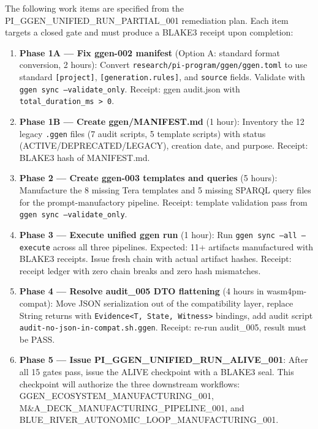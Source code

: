 The following work items are specified from the PI\_GGEN\_UNIFIED\_RUN\_PARTIAL\_001 remediation plan. Each item targets a closed gate and must produce a BLAKE3 receipt upon completion:

\begin{enumerate}
  \item \textbf{Phase 1A --- Fix ggen-002 manifest} (Option A: standard format conversion, 2 hours): Convert \texttt{research/pi-program/ggen/ggen.toml} to use standard \texttt{[project]}, \texttt{[generation.rules]}, and \texttt{source} fields. Validate with \texttt{ggen sync --validate\_only}. Receipt: ggen audit.json with \texttt{total\_duration\_ms > 0}.
  \item \textbf{Phase 1B --- Create ggen/MANIFEST.md} (1 hour): Inventory the 12 legacy \texttt{.ggen} files (7 audit scripts, 5 template scripts) with status (ACTIVE/DEPRECATED/LEGACY), creation date, and purpose. Receipt: BLAKE3 hash of MANIFEST.md.
  \item \textbf{Phase 2 --- Create ggen-003 templates and queries} (5 hours): Manufacture the 8 missing Tera templates and 5 missing SPARQL query files for the prompt-manufactory pipeline. Receipt: template validation pass from \texttt{ggen sync --validate\_only}.
  \item \textbf{Phase 3 --- Execute unified ggen run} (1 hour): Run \texttt{ggen sync --all --execute} across all three pipelines. Expected: 11+ artifacts manufactured with BLAKE3 receipts. Issue fresh chain with actual artifact hashes. Receipt: receipt ledger with zero chain breaks and zero hash mismatches.
  \item \textbf{Phase 4 --- Resolve audit\_005 DTO flattening} (4 hours in wasm4pm-compat): Move JSON serialization out of the compatibility layer, replace String returns with \texttt{Evidence<T, State, Witness>} bindings, add audit script \texttt{audit-no-json-in-compat.sh.ggen}. Receipt: re-run audit\_005, result must be PASS.
  \item \textbf{Phase 5 --- Issue PI\_GGEN\_UNIFIED\_RUN\_ALIVE\_001}: After all 15 gates pass, issue the ALIVE checkpoint with a BLAKE3 seal. This checkpoint will authorize the three downstream workflows: GGEN\_ECOSYSTEM\_MANUFACTURING\_001, M\&A\_DECK\_MANUFACTURING\_PIPELINE\_001, and BLUE\_RIVER\_AUTONOMIC\_LOOP\_MANUFACTURING\_001.
\end{enumerate}
